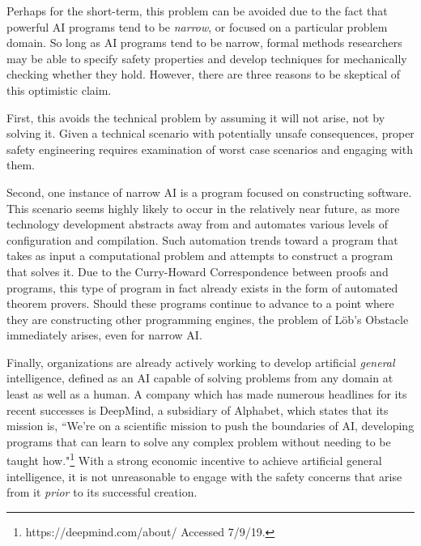Perhaps for the short-term, this problem can be avoided due to the fact that powerful AI programs tend to be \emph{narrow}, or focused on a particular problem domain. So long as AI programs tend to be narrow, formal methods researchers may be able to specify safety properties and develop techniques for mechanically checking whether they hold. However, there are three reasons to be skeptical of this optimistic claim.

First, this avoids the technical problem by assuming it will not arise, not by solving it. Given a technical scenario with potentially unsafe consequences, proper safety engineering requires examination of worst case scenarios and engaging with them.

Second, one instance of narrow AI is a program focused on constructing software. This scenario seems highly likely to occur in the relatively near future, as more technology development abstracts away from and automates various levels of configuration and compilation. Such automation trends toward a program that takes as input a computational problem and attempts to construct a program that solves it. Due to the Curry-Howard Correspondence between proofs and programs, this type of program in fact already exists in the form of automated theorem provers. Should these programs continue to advance to a point where they are constructing other programming engines, the problem of L\"ob's Obstacle immediately arises, even for narrow AI.

Finally, organizations are already actively working to develop artificial \emph{general} intelligence, defined as an AI capable of solving problems from any domain at least as well as a human. A company which has made numerous headlines for its recent successes is DeepMind, a subsidiary of Alphabet, which states that its mission is, ``We’re on a scientific mission to push the boundaries of AI, developing programs that can learn to solve any complex problem without needing to be taught how."\footnote{https://deepmind.com/about/ Accessed 7/9/19.} With a strong economic incentive to achieve artificial general intelligence, it is not unreasonable to engage with the safety concerns that arise from it \emph{prior} to its successful creation.

